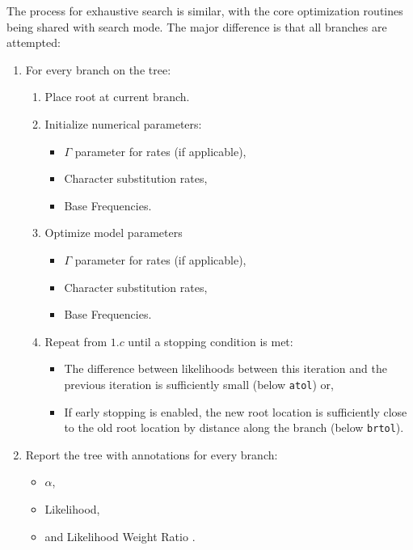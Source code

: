 \documentclass{article}
\begin{document}
The process for exhaustive search is similar, with the core optimization
routines being shared with search mode.
The major difference is that all branches are attempted: 

\begin{enumerate}
    \item For every branch on the tree:
    \begin{enumerate}
      \item Place root at current branch.
      \item Initialize numerical parameters:
                \begin{itemize}
                  \item $\Gamma$ parameter for rates (if applicable),
                  \item Character substitution rates,
                  \item Base Frequencies.
                \end{itemize}
          \item Optimize model parameters
                \begin{itemize}
                  \item $\Gamma$ parameter for rates (if applicable),
                  \item Character substitution rates,
                  \item Base Frequencies.
                \end{itemize}
          \item Repeat from $1.c$ until a stopping condition is met:
                \begin{itemize}
                  \item The difference between likelihoods between this
                        iteration and the previous iteration is sufficiently
                        small (below \texttt{atol}) or,
                  \item If early stopping is enabled, the new root location is
                        sufficiently close to the old root location by distance
                        along the branch (below \texttt{brtol}).
                \end{itemize}
    \end{enumerate}
  \item Report the tree with annotations for every branch:
    \begin{itemize}
      \item $\alpha$,
      \item Likelihood,
      \item and Likelihood Weight Ratio \cite{strimmer_inferring_2002}.
    \end{itemize}
\end{enumerate}
\end{document}
